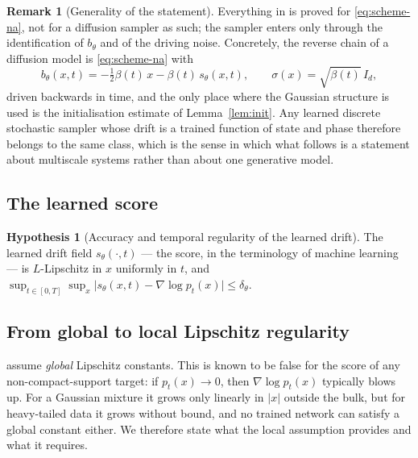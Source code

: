 \documentclass[a4paper,fleqn]{cas-dc}
\theoremstyle{definition}
\newtheorem{hypothesis}{Hypothesis}
\newtheorem{remark}[theorem]{Remark}
\begin{document}
\begin{remark}[Generality of the statement]
\label{rem:generality}
Everything in  is proved for \eqref{eq:scheme-na}, not for a diffusion
sampler as such; the sampler enters only through the identification of $b_{\theta}$ and
of the driving noise. Concretely, the reverse chain of a diffusion model is
\eqref{eq:scheme-na} with
\begin{equation}
b_{\theta}(x,t)=-\tfrac12\beta(t)\,x-\beta(t)\,s_{\theta}(x,t),
\qquad \sigma(x)=\sqrt{\beta(t)}\,I_{d},
\label{eq:reverse}
\end{equation}
driven backwards in time, and the only place where the Gaussian structure is used is
the initialisation estimate of Lemma~\ref{lem:init}. Any learned discrete stochastic sampler
whose drift is a trained function of state and phase therefore belongs to the same class,
which is the sense in which what follows is a statement about multiscale systems rather
than about one generative model.
\end{remark}

\subsection{The learned score}

\begin{hypothesis}[Accuracy and temporal regularity of the learned drift]
\label{hyp:score}
The learned drift field $s_{\theta}(\cdot,t)$ --- the score, in the terminology of
machine learning --- is $L$-Lipschitz in $x$ uniformly in $t$,
and
$\sup_{t\in[0,T]}\sup_{x}\lvert s_{\theta}(x,t)-\nabla\log p_{t}(x)\rvert \le \delta_{\theta}$.
\end{hypothesis}

\subsection{From global to local Lipschitz regularity}
\label{sec:local}

 assume \emph{global} Lipschitz constants. This is
known to be false for the score of any non-compact-support target: if
$p_{t}(x)\to0$, then $\nabla\log p_{t}(x)$ typically blows up. For a Gaussian
mixture it grows only linearly in $\lvert x\rvert$ outside the bulk, but for
heavy-tailed data it grows without bound, and no trained network can satisfy a
global constant either. We therefore state what the local assumption provides and
what it requires.
\end{document}
